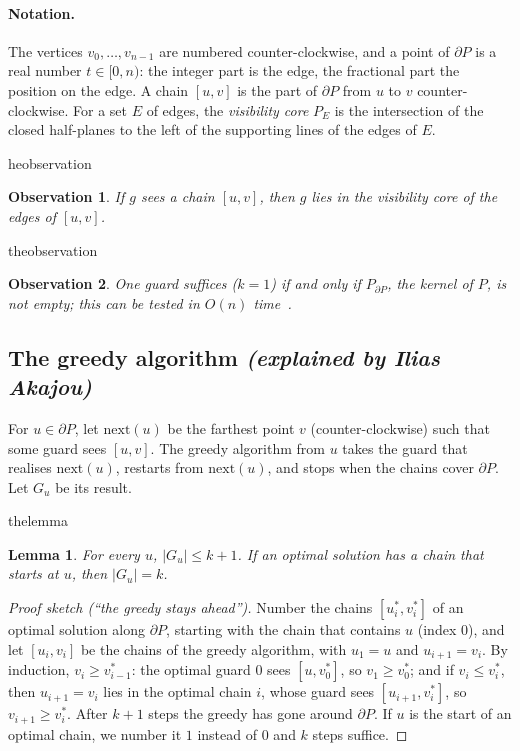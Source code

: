 \documentclass[11pt,a4paper]{article}
\newtheorem{lemma}{Lemma}
\newtheorem{observation}{Observation}
\theoremstyle{definition}
\theoremstyle{remark}
\newcommand{\paperthm}[2]{\expandafter\renewcommand\csname the#1\endcsname{#2}}
\newcommand{\nextop}{\mathrm{next}}
\newcommand{\bd}{\partial P}
\newcommand{\by}[1]{\hfill{\small\textit{(explained by #1)}}}
\begin{document}
\paragraph{Notation.} The vertices $v_0,\dots,v_{n-1}$ are numbered counter-clockwise, and a point of $\bd$ is a real number $t\in[0,n)$: the integer part is
the edge, the fractional part the position on the edge. A chain $[u,v]$ is the part of $\bd$ from $u$ to $v$ counter-clockwise. For a set $E$ of edges,
the \emph{visibility core} $P_E$ is the intersection of the closed half-planes to the left of the supporting lines of the edges of $E$.

\paperthm{observation}{2.1}
\begin{observation}
If $g$ sees a chain $[u,v]$, then $g$ lies in the visibility core of the edges of $[u,v]$.
\end{observation}
\paperthm{observation}{2.2}
\begin{observation}
One guard suffices ($k=1$) if and only if $P_{\bd}$, the kernel of $P$, is not empty; this can be tested in $O(n)$ time~\cite{LeePreparata1979}.
\end{observation}

\subsection[The greedy algorithm]{The greedy algorithm \by{Ilias Akajou}}

For $u\in\bd$, let $\nextop(u)$ be the farthest point $v$ (counter-clockwise) such that some guard sees $[u,v]$. The greedy algorithm from $u$ takes the
guard that realises $\nextop(u)$, restarts from $\nextop(u)$, and stops when the chains cover $\bd$. Let $G_u$ be its result.

\paperthm{lemma}{(greedy)}
\begin{lemma}
For every $u$, $|G_u|\le k+1$. If an optimal solution has a chain that starts at $u$, then $|G_u|=k$.
\end{lemma}
\begin{proof}[Proof sketch (``the greedy stays ahead'')]
Number the chains $[u^*_i,v^*_i]$ of an optimal solution along $\bd$, starting with the chain that contains $u$ (index $0$), and let $[u_i,v_i]$ be the chains
of the greedy algorithm, with $u_1=u$ and $u_{i+1}=v_i$. By induction, $v_i\ge v^*_{i-1}$: the optimal guard $0$ sees $[u,v^*_0]$, so $v_1\ge v^*_0$; and if
$v_i\le v^*_i$, then $u_{i+1}=v_i$ lies in the optimal chain $i$, whose guard sees $[u_{i+1},v^*_i]$, so $v_{i+1}\ge v^*_i$. After $k+1$ steps the greedy
has gone around $\bd$. If $u$ is the start of an optimal chain, we number it $1$ instead of $0$ and $k$ steps suffice.
\end{proof}
\end{document}
